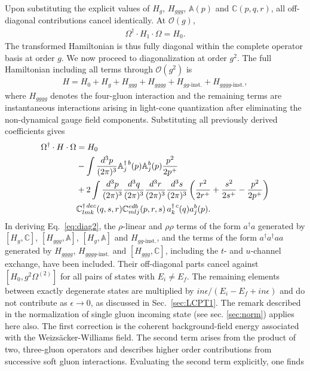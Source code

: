 \documentclass[a4paper,11pt]{article}
\def\mf#1{\mathbb{#1}}
\begin{document}
Upon substituting the explicit values of $H_{g}$, $H_{ggg}$, $\mf{A}(p)$ and $\mf{C}(p,q,r)$, all off-diagonal contributions cancel identically. At $\mathcal{O}(g)$,
\begin{align}\label{eq:diag1}
     \Omega^{\dagger}\cdot H_{1} \cdot \Omega  = H_{0}.
\end{align}
The transformed Hamiltonian is thus fully diagonal within the complete operator basis at order $g$. We now proceed to diagonalization at order $g^{2}$. The full Hamiltonian including all terms through $\mathcal{O}(g^{2})$ is
\begin{align}
    H = H_{0} + H_{g} + H_{ggg} + H_{gggg} + H_{gg\text{-inst.}} + H_{gggg\text{-inst.}},
\end{align}
where $H_{gggg}$ denotes the four-gluon interaction and the remaining terms are instantaneous interactions arising in light-cone quantization after eliminating the non-dynamical gauge field components. Substituting all previously derived coefficients gives
\begin{align}\label{eq:diag2}
     \Omega^{\dagger}\cdot H \cdot \Omega & = H_{0}\notag \\ & 
     - \int \frac{d^{3}p}{(2\pi)^{3}} \mf{A}^{\dagger\, b}_{j}(p)\mf{A}^{b}_{j}(p)\frac{p^{2}}{2p^{+}} \notag \\
     & + 2\int\frac{d^{3}p}{(2\pi)^{3}}\frac{d^{3}q}{(2\pi)^{3}} \frac{d^{3}r}{(2\pi)^{3}}\frac{d^{3}s}{(2\pi)^{3}} \left(\frac{r^{2}}{2r^{+}}+\frac{s^{2}}{2s^{+}}-\frac{p^{2}}{2p^{+}}\right)\notag \\ &
     \mf{C}^{\dagger\,dec}_{lmk}(q,s,r)\mf{C}^{edb}_{mlj}(p,r,s)\,a^{\dagger\, c}_{k}(q)a^{b}_{j}(p).
\end{align}
{\color{chg}In deriving Eq.~\eqref{eq:diag2}, the $\rho$-linear and $\rho\rho$ terms of the form $a^{\dagger}a$ generated by $[H_{g},\mf{C}]$, $[H_{ggg},\mf{A}]$, $[H_{g},\mf{A}]$ and $H_{gg\text{-inst.}}$, and the terms of the form $a^{\dagger}a^{\dagger}aa$ generated by $H_{gggg}$, $H_{gggg\text{-inst.}}$ and $[H_{ggg},\mf{C}]$, including the $t$- and $u$-channel exchange, have been included. Their off-diagonal parts cancel against $[H_{0},g^{2}\Omega^{(2)}]$ for all pairs of states with $E_{i}\neq E_{f}$. The remaining elements between exactly degenerate states are multiplied by $in\epsilon/(E_{i}-E_{f}+in\epsilon)$ and do not contribute as $\epsilon\rightarrow0$, as discussed in Sec.~\ref{sec:LCPT1}.}
The remark described in the normalization of single gluon incoming state (see sec. \ref{sec:norm}) applies here also. The first correction is the coherent background-field energy associated with the Weizsäcker-Williams field. The second term arises from the product of two, three-gluon operators and describes higher order contributions from successive soft gluon interactions. Evaluating the second term explicitly, one finds
\end{document}
